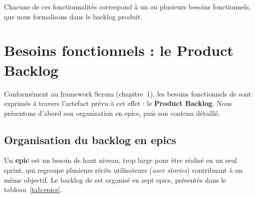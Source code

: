 
Chacune de ces fonctionnalités correspond à un ou plusieurs besoins fonctionnels, que nous formalisons dans le backlog produit.

\section{Besoins fonctionnels : le Product Backlog}

Conformément au framework Scrum (chapitre~1), les besoins fonctionnels de \projet{} sont exprimés à travers l'artefact prévu à cet effet : le \textbf{Product Backlog}. Nous présentons d'abord son organisation en epics, puis son contenu détaillé.

\subsection{Organisation du backlog en epics}

Un \textbf{epic} est un besoin de haut niveau, trop large pour être réalisé en un seul sprint, qui regroupe plusieurs récits utilisateurs (\textit{user stories}) contribuant à un même objectif. Le backlog de \projet{} est organisé en sept epics, présentés dans le tableau~\ref{tab:epics}.

